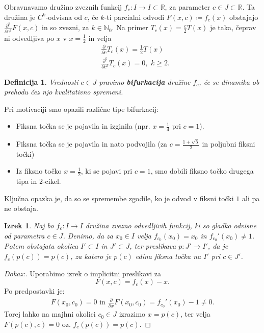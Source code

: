 \documentclass{article}
\newtheorem{definicija}{Definicija}
\newtheorem{izrek}{Izrek}
\newcommand{\N}{\mathbb{N}}
\newcommand{\R}{\mathbb{R}}
\begin{document}
Obravnavamo družino zveznih funkcij $f_c: I \rightarrow I \subset \R$, 
za parameter $c\in J \subset \R$. Ta družina je $C^k$-odvisna od $c$, če 
$k$-ti parcialni odvodi $F(x, c) \coloneqq f_c(x)$ obstajajo
$\frac{\partial^k}{\partial c^k} F(x, c)$ in so zvezni, za $k\in \N_0$. 
Na primer $T_c(x) = \frac{c}{2} T(x)$ je taka, čeprav ni odvedljiva po $x$ v 
$x = \frac{1}{2}$ in velja
\begin{align*}
&\frac{\partial}{\partial c} T_c(x) = \frac{1}{2} T(x) \\ 
&\frac{\partial^k}{\partial c^k} T_c(x) = 0, \,\, k \geq 2.
\end{align*}

\begin{definicija}
Vrednosti $c\in J$ pravimo \textbf{bifurkacija} družine $f_c$, če se dinamika 
ob prehodu čez njo kvalitativno spremeni.
\end{definicija}

Pri motivaciji smo opazili različne tipe bifurkacij:
\begin{itemize}
\item Fiksna točka se je pojavila in izginila (npr. $x = \frac{1}{4}$ pri $c=1$).
\item Fiksna točka se je pojavila in nato podvojila (za $c = \frac{1 + \sqrt{5}}{2}$ in poljubni fiksni točki)
\item Iz fiksno točko $x = \frac{1}{2}$, ki se pojavi pri $c = 1$, smo dobili fiksno točko drugega tipa in $2$-cikel.
\end{itemize}
Ključna opazka je, da so se spremembe zgodile, ko je odvod v fiksni točki $1$ ali pa ne obstaja.

\begin{izrek}
    \label{izrek:implicitna_preslikava}
Naj bo $f_c: I \rightarrow I$ družina zvezno odvedljivih funkcij, ki 
so gladko odvisne od parametra $c\in J$. Denimo, da za $x_0 \in I$ 
velja $f_{c_0}(x_0) = x_0$ in $f_{c_0}'(x_0) \neq 1$. Potem obstajata 
okolica $I' \subset I$ in $J' \subset J$, ter preslikava 
$p: J' \rightarrow I'$, da je $f_c(p(c)) = p(c)$, za katero je $p(c)$
 edina fiksna točka na $I'$ pri $c\in J'$. 
\end{izrek}

\begin{proof}[Dokaz:]
Uporabimo izrek o implicitni preslikavi za 
$$
F(x, c) = f_c(x) - x.
$$
Po predpostavki je:
\begin{align*}
F(x_0, c_0) = 0 \text{ in } \frac{\partial}{\partial x} F(x_0, c_0) = f_{c_0}'(x_0) - 1 \neq 0. 
\end{align*}
Torej lahko na majhni okolici $c_0 \in J$ izrazimo $x = p(c)$, ter velja $F(p(c), c) = 0$ oz. $f_c(p(c)) = p(c)$.
\end{proof}
\end{document}
